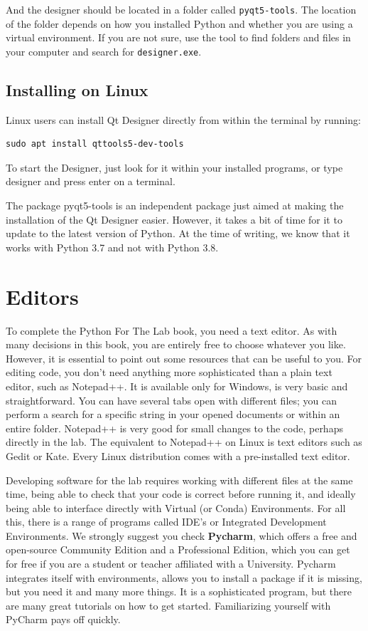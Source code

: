 And the designer should be located in a folder called \texttt{pyqt5-tools}. The location of the folder depends on how you installed Python and whether you are using a virtual environment. If you are not sure, use the tool to find folders and files in your computer and search for \texttt{designer.exe}.

\subsection{Installing on Linux}\label{subsec:installing-on-linux}
Linux users can install Qt Designer directly from within the terminal by running:

\begin{verbatim}
sudo apt install qttools5-dev-tools
\end{verbatim}

To start the Designer, just look for it within your installed programs, or type designer and press enter on a terminal.

The package pyqt5-tools is an independent package just aimed at making the installation of the Qt Designer easier. However, it takes a bit of time for it to update to the latest version of Python. At the time of writing, we know that it works with Python 3.7 and not with Python 3.8.

\section{Editors}\label{sec:editors}
To complete the Python For The Lab book, you need a text editor. As with many decisions in this book, you are entirely free to choose whatever you like. However, it is essential to point out some resources that can be useful to you. For editing code, you don't need anything more sophisticated than a plain text editor, such as Notepad++. It is available only for Windows, is very basic and straightforward. You can have several tabs open with different files; you can perform a search for a specific string in your opened documents or within an entire folder. Notepad++ is very good for small changes to the code, perhaps directly in the lab. The equivalent to Notepad++ on Linux is text editors such as Gedit or Kate. Every Linux distribution comes with a pre-installed text editor.

Developing software for the lab requires working with different files at the same time, being able to check that your code is correct before running it, and ideally being able to interface directly with Virtual (or Conda) Environments. For all this, there is a range of programs called IDE's or Integrated Development Environments. We strongly suggest you check \textbf{Pycharm}, which offers a free and open-source Community Edition and a Professional Edition, which you can get for free if you are a student or teacher affiliated with a University. Pycharm integrates itself with environments, allows you to install a package if it is missing, but you need it and many more things. It is a sophisticated program, but there are many great tutorials on how to get started. Familiarizing yourself with PyCharm pays off quickly.

